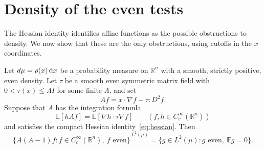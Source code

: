 \section{Density of the even tests}\label{sec:density}

The Hessian identity identifies affine functions as the possible obstructions to density.  We now show that these are the only obstructions, using cutoffs in the $x$ coordinates.

\begin{lemma}\label{lem:density}
Let $d\mu=\rho(x)\,\mathrm{d} x$ be a probability measure on $\mathbb{R}^n$ with a smooth, strictly positive, even density.  Let $\tau$ be a smooth even symmetric matrix field with $0<\tau(x)\le\Lambda I$ for some finite $\Lambda$, and set
\[
 Af=x\cdot\nabla f-\tau:D^2f.
\]
Suppose that $A$ has the integration formula
\[
 \mathbb{E}[hAf]=\mathbb{E}[\nabla h\cdot\tau\nabla f]
 \qquad(f,h\in C_c^\infty(\mathbb{R}^n))
\]
and satisfies the compact Hessian identity~\eqref{eq:hessian}. Then
\[
 \overline{\{A(A-1)f:f\in C_c^\infty(\mathbb{R}^n),\ f\text{ even}\}}^{\,L^2(\mu)}
 =\{g\in L^2(\mu):g\text{ even},\ \mathbb{E}g=0\}.
\]
\end{lemma}

